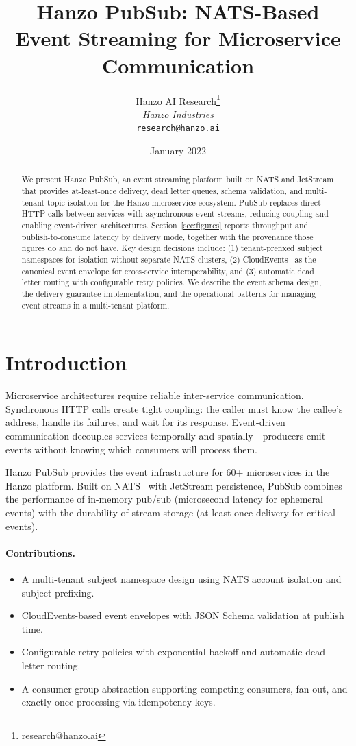 \documentclass[11pt,twocolumn]{article}
\title{Hanzo PubSub: NATS-Based Event Streaming for Microservice Communication}
\author{Hanzo AI Research\thanks{research@hanzo.ai} \\ \textit{Hanzo Industries} \\ \texttt{research@hanzo.ai}}
\date{January 2022}
\begin{document}
\hanzocoverpage

\begin{abstract}
We present Hanzo PubSub, an event streaming platform built on NATS and JetStream that provides at-least-once delivery, dead letter queues, schema validation, and multi-tenant topic isolation for the Hanzo microservice ecosystem. PubSub replaces direct HTTP calls between services with asynchronous event streams, reducing coupling and enabling event-driven architectures. Section~\ref{sec:figures} reports throughput and publish-to-consume latency by delivery mode, together with the provenance those figures do and do not have. Key design decisions include: (1) tenant-prefixed subject namespaces for isolation without separate NATS clusters, (2) CloudEvents~\cite{cloudevents2019} as the canonical event envelope for cross-service interoperability, and (3) automatic dead letter routing with configurable retry policies. We describe the event schema design, the delivery guarantee implementation, and the operational patterns for managing event streams in a multi-tenant platform.
\end{abstract}

\section{Introduction}

Microservice architectures require reliable inter-service communication. Synchronous HTTP calls create tight coupling: the caller must know the callee's address, handle its failures, and wait for its response. Event-driven communication decouples services temporally and spatially---producers emit events without knowing which consumers will process them.

Hanzo PubSub provides the event infrastructure for 60+ microservices in the Hanzo platform. Built on NATS~\cite{nats2016} with JetStream persistence, PubSub combines the performance of in-memory pub/sub (microsecond latency for ephemeral events) with the durability of stream storage (at-least-once delivery for critical events).

\paragraph{Contributions.}
\begin{itemize}
    \item A multi-tenant subject namespace design using NATS account isolation and subject prefixing.
    \item CloudEvents-based event envelopes with JSON Schema validation at publish time.
    \item Configurable retry policies with exponential backoff and automatic dead letter routing.
    \item A consumer group abstraction supporting competing consumers, fan-out, and exactly-once processing via idempotency keys.
\end{itemize}
\end{document}
